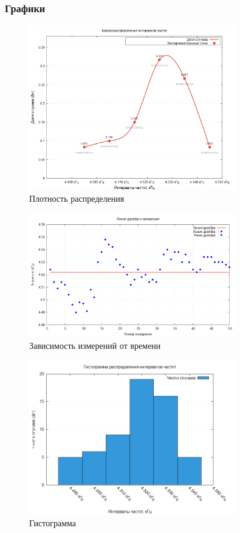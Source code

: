 \subsubsection{Графики}


\begin{figure}[ht!]
\centering
\includegraphics[width=0.8\textwidth]{smooth_distribution_ms.png}
\caption{Плотность распределения}
\label{fig:plot}
\end{figure}

\begin{figure}[ht!]
\centering
\includegraphics[width=0.8\textwidth]{plot2_drift.png}
\caption{Зависимость измерений от времени}
\label{fig:plot}
\end{figure}

\begin{figure}[ht!]
\centering
\includegraphics[width=0.8\textwidth]{histogram_ms.png}
\caption{Гистограмма}
\label{fig:plot}
\end{figure}

